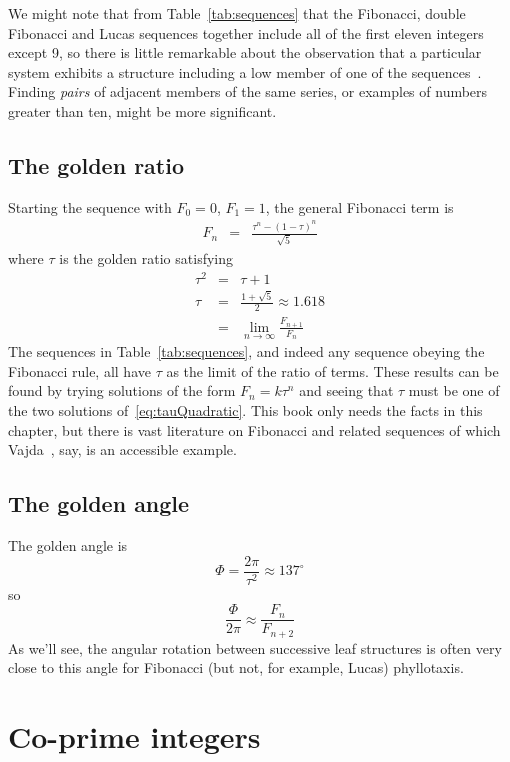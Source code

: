We might note that from Table~\ref{tab:sequences} that the Fibonacci, double Fibonacci and Lucas sequences together include all  of the first eleven integers except 9, so there is little remarkable about the observation that a particular system exhibits a structure including a low member of one of the sequences~\cite{cookeFibonacciNumbersReveal2006}. Finding \textit{pairs} of adjacent members of the same series, or examples of numbers greater than ten, might be more significant.

\subsection{The golden ratio}
Starting the sequence with $F_0=0$, $F_1=1$, the general Fibonacci term is 
\begin{eqnarray}
F_n &=& \frac{\tau^n - (1-\tau)^n}{\sqrt{5}}
\end{eqnarray}
where $\tau$ is the golden ratio 
satisfying
\begin{eqnarray}
\tau^2 &=& \tau+1 \label{eq:tauQuadratic}
\\
\tau &=& \frac{1+\sqrt{5}}{2} \approx 1.618
\\
&=& \lim_{n\rightarrow\infty} \frac{F_{n+1}}{F_n} 
\end{eqnarray}
The sequences in Table~\ref{tab:sequences}, and indeed any sequence obeying the Fibonacci rule, all have $\tau$  as the limit of the ratio of terms. These results can be found by trying solutions of the form $F_n=k\tau^n$ and seeing that $\tau$ must be one of the two solutions of~\eqref{eq:tauQuadratic}. This book only needs the facts in this chapter, but there is vast literature on Fibonacci and related sequences of which Vajda~\cite{vajdaFibonacciLucasNumbers2008}, say, is an  accessible example. 

\subsection{The golden angle}
The golden angle is
\[
\Phi = \frac{2\pi}{\tau^2}  \approx 137^\circ
\]
so
\[
\frac{\Phi}{2 \pi} \approx \frac{F_{n}}{F_{n+2}}
\]
As we'll see, the angular rotation between successive leaf structures is often very close to this angle for Fibonacci (but not, for example, Lucas) phyllotaxis.




\section{Co-prime integers}

